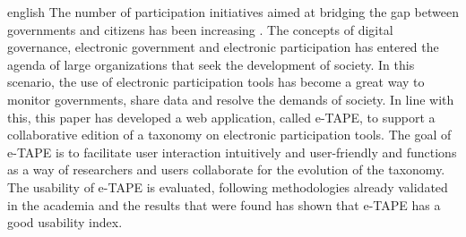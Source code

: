 \begin{resumo}[Abstract]
 \begin{otherlanguage*}{english}
The number of participation initiatives aimed at bridging the gap between governments and citizens has been increasing .
The concepts of digital governance, electronic government and electronic participation has entered the agenda of large organizations that seek the development of society.
In this scenario, the use of electronic participation tools has become a great way to monitor governments, share data and resolve the demands of society.
In line with this, this paper has developed a web application, called e-TAPE, to support a collaborative edition of a taxonomy on electronic participation tools.
The goal of e-TAPE is to facilitate user interaction intuitively and user-friendly and functions as a way of researchers and users collaborate for the evolution of the taxonomy.
The usability of e-TAPE is evaluated, following methodologies already validated in the academia and the results that were found has shown that e-TAPE has a good usability index.
 \end{otherlanguage*}
\end{resumo}
\newpage